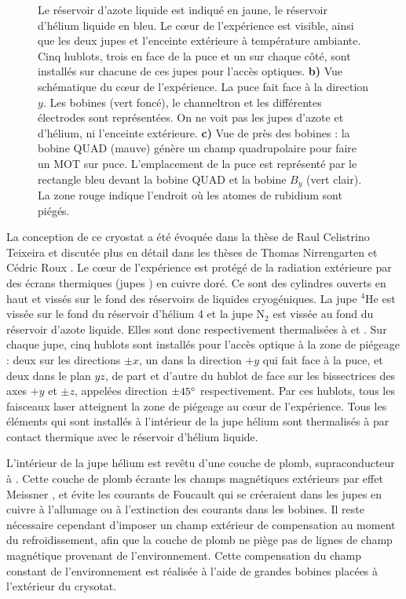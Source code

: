 \begin{figure}
{Le réservoir d'azote liquide est indiqué en jaune, le réservoir d'hélium liquide en bleu.
Le c\oe ur de l'expérience est visible, ainsi que les deux \og jupes \fg{} et l'enceinte extérieure à température ambiante.
Cinq hublots, trois en face de la puce et un sur chaque côté, sont installés sur chacune de ces jupes pour l'accès optiques.
\textbf{b)} Vue schématique du c\oe ur de l'expérience. La puce fait face à la direction $y$. Les bobines (vert foncé), le channeltron et les différentes électrodes sont représentées. On ne voit pas les \og jupes \fg{} d'azote et d'hélium, ni l'enceinte extérieure.
\textbf{c)} Vue de près des bobines : la bobine QUAD (mauve) génère un champ quadrupolaire pour faire un MOT sur puce. L'emplacement de la puce est représenté par le rectangle bleu devant la bobine QUAD et la bobine $B_y$ (vert clair).
La zone rouge indique l'endroit où les atomes de rubidium sont piégés.
}
\label{fig:cryo}
\end{figure}
%
La conception de ce cryostat a été évoquée dans la thèse de Raul Celistrino Teixeira \cite{PHD_CELISTRINO}  et discutée plus en détail dans les thèses de Thomas Nirrengarten \cite{PHD_NIRRENGARTEN} et Cédric Roux \cite{PHD_ROUX}.
Le c\oe ur de l'expérience est protégé de la radiation extérieure par des écrans thermiques (\og jupes \fg{}) en cuivre doré. Ce sont des cylindres ouverts en haut et vissés sur le fond des réservoirs de liquides cryogéniques.
La jupe $^4 \text{He}$ est vissée sur le fond du réservoir d'hélium 4 et la jupe $\text{N}_2$ est vissée au fond du réservoir d'azote liquide.
Elles sont donc respectivement thermalisées à  et .
Sur chaque jupe, cinq hublots sont installés pour l'accès optique à la zone de piégeage :
deux sur les directions $\pm x$, un dans la direction $+y$ qui fait face à la puce, et deux  dans le plan $yz$, de part et d'autre du hublot de face sur les bissectrices des axes $+y$ et $\pm z$, appelées direction $\pm\SIvv{45}{\degree}$ respectivement.
Par ces hublots, tous les faisceaux laser atteignent la zone de piégeage au c\oe ur de l'expérience.
Tous les éléments qui sont installés à l'intérieur de la jupe hélium sont thermalisés à  par contact thermique avec le réservoir d'hélium liquide.

L'intérieur de la jupe hélium est revêtu d'une couche de plomb, supraconducteur à \Khe. Cette couche de plomb écrante les champs magnétiques extérieurs par effet Meissner \cite{MX_MEISSNEREFFECT}, et évite les courants de Foucault qui se créeraient dans les jupes en cuivre à l'allumage ou à l'extinction des courants dans les bobines. 
Il reste nécessaire cependant d'imposer un champ extérieur de compensation au moment du refroidissement, afin que la couche de plomb ne piège pas de lignes de champ magnétique provenant de l'environnement.
Cette compensation du champ constant de l'environnement est réalisée à l'aide de grandes bobines placées à l'extérieur du crysotat.

